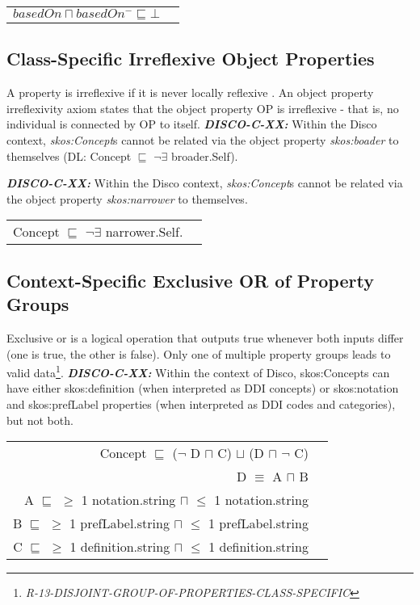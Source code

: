 \documentclass{llncs}
\newenvironment{DL}{
  \vspace{0cm}
  \begin{tabular}{r l}

}{
  \end{tabular}
}
\begin{document}
\begin{DL}
$basedOn \sqcap basedOn^{-} \sqsubseteq \bot$ 
\end{DL}

\subsection{Class-Specific Irreflexive Object Properties}

A property is irreflexive if it is never locally reflexive \cite{Kroetzsch2012}.
An object property irreflexivity axiom states that the object property OP is irreflexive - that is, no individual is connected by OP to itself. 
\textbf{{\em DISCO-C-XX:}}
Within the Disco context, {\em skos:Concept}s cannot be related via the object property {\em skos:boader} to themselves (DL: Concept $\sqsubseteq$ $\neg$$\exists$ broader.Self).

\textbf{{\em DISCO-C-XX:}}
Within the Disco context, {\em skos:Concept}s cannot be related via the object property {\em skos:narrower} to themselves. 

\begin{DL}
Concept $\sqsubseteq$ $\neg$$\exists$ narrower.Self. 
\end{DL}

\subsection{Context-Specific Exclusive OR of Property Groups}

Exclusive or is a logical operation that outputs true whenever both inputs differ (one is true, the other is false).
Only one of multiple property groups leads to valid data\footnote{{\em R-13-DISJOINT-GROUP-OF-PROPERTIES-CLASS-SPECIFIC}}.
\textbf{{\em DISCO-C-XX:}}
Within the context of Disco, skos:Concepts can have either skos:definition (when interpreted as DDI concepts) or skos:notation and skos:prefLabel properties (when interpreted as DDI codes and categories), but not both.

\begin{DL}
Concept $\sqsubseteq$ ($\neg$ D $\sqcap$ C) $\sqcup$ (D $\sqcap$ $\neg$ C) \\ 
D $\equiv$ A $\sqcap$ B \\
A $\sqsubseteq$ $\geq$ 1 notation.string $\sqcap$ $\leq$ 1 notation.string \\
B $\sqsubseteq$ $\geq$ 1 prefLabel.string $\sqcap$ $\leq$ 1 prefLabel.string \\
C $\sqsubseteq$ $\geq$ 1 definition.string $\sqcap$ $\leq$ 1 definition.string \\
\end{DL}
\end{document}
